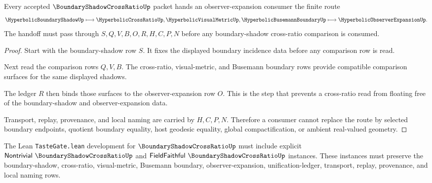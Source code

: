 \begin{theorem}
\label{thm:boundary-shadow-cross-ratio-observer-handoff}
Every accepted $\BoundaryShadowCrossRatioUp$ packet hands an observer-expansion consumer the finite route
$$
\HyperbolicBoundaryShadowUp \longmapsto \HyperbolicCrossRatioUp,\HyperbolicVisualMetricUp,\HyperbolicBusemannBoundaryUp \longmapsto \HyperbolicObserverExpansionUp .
$$
The handoff must pass through $S,Q,V,B,O,R,H,C,P,N$ before any boundary-shadow cross-ratio comparison is consumed.
\end{theorem}
\begin{proof}
Start with the boundary-shadow row $S$. It fixes the displayed boundary incidence data before any comparison row is read.

Next read the comparison rows $Q,V,B$. The cross-ratio, visual-metric, and Busemann boundary rows provide compatible comparison surfaces for the same displayed shadows.

The ledger $R$ then binds those surfaces to the observer-expansion row $O$. This is the step that prevents a cross-ratio read from floating free of the boundary-shadow and observer-expansion data.

Transport, replay, provenance, and local naming are carried by $H,C,P,N$. Therefore a consumer cannot replace the route by selected boundary endpoints, quotient boundary equality, host geodesic equality, global compactification, or ambient real-valued geometry.
\end{proof}

The Lean \texttt{TasteGate.lean} development for $\BoundaryShadowCrossRatioUp$ must include explicit $\mathsf{Nontrivial}\ \BoundaryShadowCrossRatioUp$ and $\mathsf{FieldFaithful}\ \BoundaryShadowCrossRatioUp$ instances. These instances must preserve the boundary-shadow, cross-ratio, visual-metric, Busemann boundary, observer-expansion, unification-ledger, transport, replay, provenance, and local naming rows.


